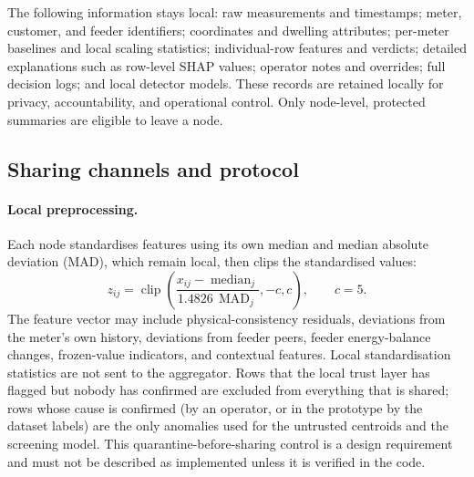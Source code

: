 The following information stays local: raw measurements and timestamps; meter, customer, and feeder identifiers; coordinates and dwelling attributes; per-meter baselines and local scaling statistics; individual-row features and verdicts; detailed explanations such as row-level SHAP values; operator notes and overrides; full decision logs; and local detector models. These records are retained locally for privacy, accountability, and operational control. Only node-level, protected summaries are eligible to leave a node.

\subsection{Sharing channels and protocol}
\paragraph{Local preprocessing.} Each node standardises features using its own median and median absolute deviation (MAD), which remain local, then clips the standardised values:
\begin{equation}
 z_{ij}=\operatorname{clip}\!\left(
 \frac{x_{ij}-\operatorname{median}_j}{1.4826\,\operatorname{MAD}_j},-c,c\right),
 \qquad c=5.
 \label{eq:goal4-clipping}
\end{equation}
The feature vector may include physical-consistency residuals, deviations from the meter's own history, deviations from feeder peers, feeder energy-balance changes, frozen-value indicators, and contextual features. Local standardisation statistics are not sent to the aggregator. Rows that the local trust layer has flagged but nobody has confirmed are excluded from everything that is shared; rows whose cause is confirmed (by an operator, or in the prototype by the dataset labels) are the only anomalies used for the untrusted centroids and the screening model. This quarantine-before-sharing control is a design requirement and must not be described as implemented unless it is verified in the code.


